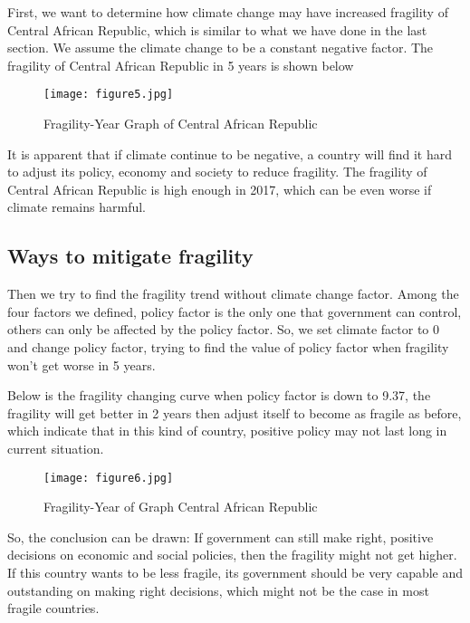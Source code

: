 \documentclass{mcmthesis}
\begin{document}
	First, we want to determine how climate change may have increased fragility of Central African Republic, which is similar to what we have done in the last section. We assume the climate change to be a constant negative factor. The fragility of Central African Republic in 5 years is shown below
	
	\begin{figure}[h]
		\small
		\centering
		\texttt{[image: figure5.jpg]}
		\caption{Fragility-Year Graph of Central African Republic} \label{fig:Fragility-Year Central African Republic}
	\end{figure}
	
	It is apparent that if climate continue to be negative, a country will find it hard to adjust its policy, economy and society to reduce fragility. The fragility of Central African Republic is high enough in 2017, which can be even worse if climate remains harmful.


	\subsection{Ways to mitigate fragility}
	Then we try to find the fragility trend without climate change factor. Among the four factors we defined, policy factor is the only one that government can control, others can only be affected by the policy factor. So, we set climate factor to 0 and change policy factor, trying to find the value of policy factor when fragility won’t get worse in 5 years.
	
	Below is the fragility changing curve when policy factor is down to 9.37, the fragility will get better in 2 years then adjust itself to become as fragile as before, which indicate that in this kind of country, positive policy may not last long in current situation.
	
	\begin{figure}[h]
		\small
		\centering
		\texttt{[image: figure6.jpg]}
		\caption{Fragility-Year of Graph Central African Republic} \label{fig:Fragility-Year Central African Republic}
	\end{figure}
	
	So, the conclusion can be drawn: If government can still make right, positive decisions on economic and social policies, then the fragility might not get higher. If this country wants to be less fragile, its government should be very capable and outstanding on making right decisions, which might not be the case in most fragile countries.
\end{document}
